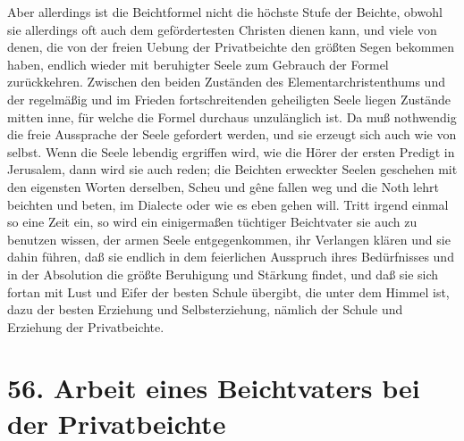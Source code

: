 Aber allerdings ist die Beichtformel nicht die höchste Stufe der Beichte, obwohl sie allerdings oft auch dem gefördertesten Christen dienen kann, und viele von denen, die von der freien Uebung der Privatbeichte den größten Segen bekommen haben, endlich wieder mit beruhigter Seele zum Gebrauch der Formel zurückkehren. Zwischen den beiden Zuständen des Elementarchristenthums und der regelmäßig und im Frieden fortschreitenden geheiligten Seele liegen Zustände mitten inne, für welche die Formel durchaus unzulänglich ist. Da muß nothwendig die freie Aussprache der Seele gefordert werden, und sie erzeugt sich auch wie von selbst. Wenn die Seele lebendig ergriffen wird, wie die Hörer der ersten Predigt in Jerusalem, dann wird sie auch reden; die Beichten erweckter Seelen geschehen mit den eigensten Worten derselben, Scheu und gêne fallen weg und die Noth lehrt beichten und beten, im Dialecte oder wie es eben gehen will. Tritt irgend einmal so eine Zeit ein, so wird ein einigermaßen tüchtiger Beichtvater sie auch zu benutzen wissen, der armen Seele entgegenkommen, ihr Verlangen klären und sie dahin führen, daß sie endlich in dem feierlichen Ausspruch ihres Bedürfnisses und in der Absolution die größte Beruhigung und Stärkung findet, und daß sie sich fortan mit Lust und
Eifer der besten Schule übergibt, die unter dem Himmel ist, dazu der besten Erziehung und Selbsterziehung, nämlich der Schule und Erziehung der Privatbeichte.

\section[56. Arbeit eines Beichtvaters]{56. Arbeit eines Beichtvaters bei der Privatbeichte}

